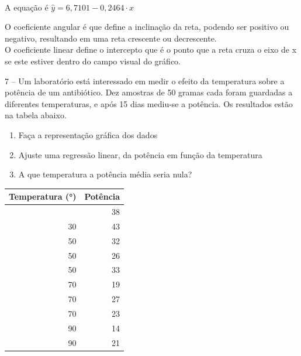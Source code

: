 \documentclass[11pt]{article}
\providecommand{\tightlist}{%
      \setlength{\itemsep}{0pt}\setlength{\parskip}{0pt}}
\begin{document}
    \begin{center}
    \end{center}
    { \hspace*{\fill} \\}
    
    A equação é \(\hat{y}  = 6,7101 -0,2464\cdot x\)

O coeficiente angular é que define a inclinação da reta, podendo ser
positivo ou negativo, resultando em uma reta crescente ou decrescente.\\
O coeficiente linear define o intercepto que é o ponto que a reta cruza
o eixo de x se este estiver dentro do campo visual do gráfico.

    7 -- Um laboratório está interessado em medir o efeito da temperatura
sobre a potência de um antibiótico. Dez amostras de 50 gramas cada foram
guardadas a diferentes temperaturas, e após 15 dias mediu-se a potência.
Os resultados estão na tabela abaixo.

\begin{enumerate}
\def\labelenumi{\alph{enumi})}
\tightlist
\item
  Faça a representação gráfica dos dados\\
\item
  Ajuste uma regressão linear, da potência em função da temperatura\\
\item
  A que temperatura a potência média seria nula?
\end{enumerate}

{\def\LTcaptype{none} %
\begin{longtable}[]{@{}rr@{}}
\toprule\noalign{}
Temperatura (°) & Potência \\
\midrule\noalign{}
\endhead
\bottomrule\noalign{}
\endlastfoot
30 & 38 \\
30 & 43 \\
50 & 32 \\
50 & 26 \\
50 & 33 \\
70 & 19 \\
70 & 27 \\
70 & 23 \\
90 & 14 \\
90 & 21 \\
\end{longtable}
}
\end{document}

